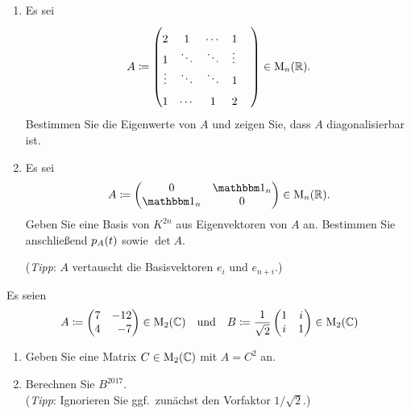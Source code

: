 \documentclass[a4paper, 10pt]{scrartcl}
\begin{document}
\begin{question}[subtitle = Diagonalisieren]
  \begin{enumerate}
    \item
      Es sei
      \[
                  A
        \coloneqq \begin{pmatrix}
                    2       & 1       & \cdots  & 1       \phantom{\ddots}  \\
                    1       & \ddots  & \ddots  & \vdots  \phantom{\ddots}  \\
                    \vdots  & \ddots  & \ddots  & 1       \phantom{\ddots}  \\
                    1       & \cdots  & 1       & 2       \phantom{\ddots}
                  \end{pmatrix}
        \in       \operatorname{M}_{n}(\mathbb{R}).
      \]
      Bestimmen Sie die Eigenwerte von $A$ und zeigen Sie, dass $A$ diagonalisierbar ist.
    \item
      Es sei
      \[
                  A
        \coloneqq \begin{pmatrix}
                    0     & \Id_n \\
                    \Id_n & 0
                  \end{pmatrix}
        \in       \matrices{n}{\Real}.
      \]
      Geben Sie eine Basis von $K^{2n}$ aus Eigenvektoren von $A$ an.
      Bestimmen Sie anschließend $p_{A}(t)$ sowie $\det A$.
      
      (\emph{Tipp}: $A$ vertauscht die Basisvektoren $e_i$ und $e_{n+i}$.)
  \end{enumerate}
\end{question}





\begin{question}[subtitle = Wurzeln und Potenzen]
  Es seien
  \[
              A
    \coloneqq \begin{pmatrix*}[r]
                7 & -12 \\
                4 &  -7
              \end{pmatrix*}
              \in \matrices{2}{\Complex}
    \quad\text{und}\quad
              B
    \coloneqq \frac{1}{\sqrt{2}}
              \begin{pmatrix}
                1 & i \\
                i & 1
              \end{pmatrix}
              \in \matrices{2}{\Complex}
  \]
  \begin{enumerate}
    \item
      Geben Sie eine Matrix $C \in \operatorname{M}_{2}(\mathbb{C})$ mit $A = C^2$ an.
    \item
      Berechnen Sie $B^{2017}$.
      \\
      (\emph{Tipp}:
       Ignorieren Sie ggf.\ zunächst den Vorfaktor $1/\sqrt{2}$.)
  \end{enumerate}
\end{question}
\end{document}
